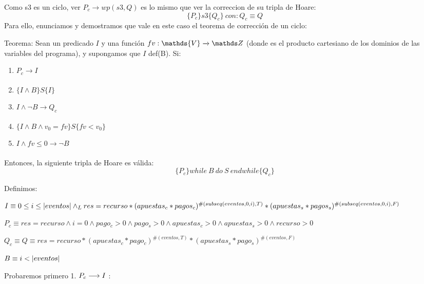 \documentclass[10pt,a4paper]{article}
\begin{document}
Como s3 es un ciclo, ver $P_c \xrightarrow{} wp(s3,Q)$ es lo mismo que ver la correccion de su tripla de Hoare:
\begin{equation}
	\{P_c\} s3 \{Q_c\}\  con: Q_c \equiv Q
	\label{eq:4}
\end{equation}
Para ello, enunciamos y demostramos que vale en este caso el teorema de corrección de un ciclo:

Teorema: Sean un predicado $I$ y una función $fv : \mathds{V} \xrightarrow{} \ent$
(donde  es el producto cartesiano de los dominios de las
variables del programa), y supongamos que $I$ \xrightarrow[]{} def(B). Si:\\

\begin{enumerate}
    \item $P_c \xrightarrow[]{} I$
    \item$\{I \land B\} S \{I \}$
    \item $I \land \lnot B \xrightarrow[]{} Q_c$
    \item$\{I \land B \land v_0 = fv\} S \{fv < v_0\}$
    \item$I \land fv \leq 0 \xrightarrow[]{} \lnot B$
\end{enumerate}

Entonces, la siguiente tripla de Hoare es válida:
\begin{equation}
	\{P_c \} while\  B\  do\  S\  endwhile \{Q_c\}
    \label{eq:5}
\end{equation}




Definimos:

\vspace{4pt}
$I \equiv 0 \leq i \leq |eventos| \land _L res = recurso*(apuestas_c * pagos_c)^{\#(subseq(eventos, 0, i), T)}*(apuestas_s * pagos_s)^{\#(subseq(eventos, 0, i), F)}$


\vspace{8pt}
$P_c \equiv res = recurso \land i = 0 \land pago_c > 0 \land pago_s > 0 \land apuestas_c > 0 \land apuestas_s > 0 \land recurso > 0$

\vspace{8pt}
$Q_c \equiv Q \equiv res = recurso*(apuestas_c * pago_c)^{\#(eventos, T)}*(apuestas_s * pago_s)^{\#(eventos, F)}$

\vspace{8pt}
$B \equiv i < |eventos|$

\vspace{16pt}
Probaremos primero 1. $P_c \longrightarrow I$ :
\end{document}
